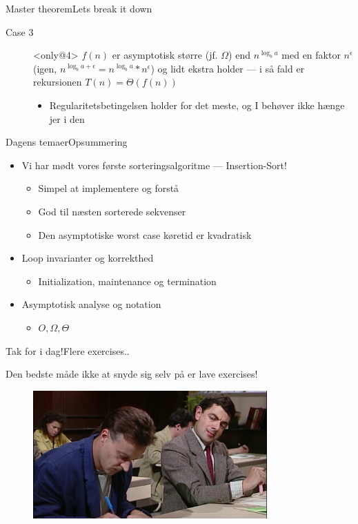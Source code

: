 \documentclass[aspectratio=1610]{beamer}
\begin{document}
\begin{frame}[t]{Master theorem}{Lets break it down}
\begin{description}
        \item[Case 3]<only@4> $f(n)$ er \alert{asymptotisk større} (jf.
            $\Omega$) end $n^{\log_b a}$ med en faktor $n^{\epsilon}$ (igen,
            $n^{\log_b a + \epsilon} = n^{\log_b a} * n^{\epsilon}$) og lidt
            ekstra holder --- i så fald er rekursionen $T(n) = \Theta(f(n))$

            \begin{itemize}
                \small
                \item \alert{Regularitetsbetingelsen} holder for det meste, og I
                    behøver ikke hænge jer i den
            \end{itemize}
    \end{description}
\end{frame}






\begin{frame}{Dagens temaer}{Opsummering}
    \begin{itemize}
        \item Vi har mødt vores første sorteringsalgoritme --- Insertion-Sort!
            \begin{itemize}
                \item Simpel at implementere og forstå
                \item God til næsten sorterede sekvenser
                \item Den asymptotiske worst case køretid er kvadratisk
            \end{itemize}
        \item Loop invarianter og korrekthed
            \begin{itemize}
                \item Initialization, maintenance og termination
            \end{itemize}
        \item Asymptotisk analyse og notation
            \begin{itemize}
                \item $O, \Omega, \Theta$
            \end{itemize}
    \end{itemize}
\end{frame}


\begin{frame}{Tak for i dag!}{Flere exercises..}

    Den bedste måde ikke at snyde sig selv på er lave exercises!

    \begin{figure}[h]
        \centering
        \includegraphics[width=0.8\textwidth]{exercises}
    \end{figure}
    
\end{frame}
\end{document}
